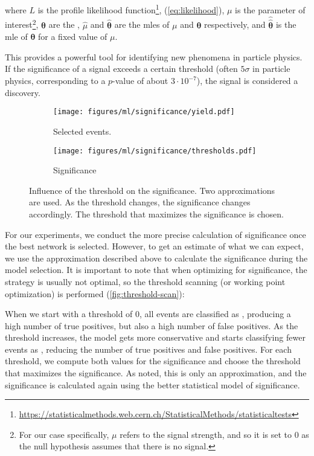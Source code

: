where $L$ is the profile likelihood
function\footnote{\url{https://statisticalmethods.web.cern.ch/StatisticalMethods/statisticaltests}},
(\autoref{eq:likelihood}), $\mu$ is the parameter of interest\footnote{For our case specifically, $\mu$ refers to the
    signal strength, and so it is set to $0$ as the null hypothesis assumes that there is no signal.}, $\bm{\theta}$ are
the , $\hat{\mu}$ and $\hat{\bm{\theta}}$ are the \glspl{mle} of $\mu$ and $\bm{\theta}$ respectively, and
$\hat{\hat{\bm{\theta}}}$ is the \gls{mle} of $\bm{\theta}$ for a fixed value of $\mu$.

This provides a powerful tool for identifying new phenomena in particle physics. If the significance of a signal exceeds
a certain threshold (often $5\sigma$ in particle physics, corresponding to a $p$-value of about $3\cdot10^{-7}$), the
signal is considered a discovery.

\begin{figure}[htb]
    \centering
    \begin{subfigure}[t]{0.47\textwidth}
        \texttt{[image: figures/ml/significance/yield.pdf]}
        \caption{Selected events.}
        \label{fig:signal-yield}
    \end{subfigure}
    \begin{subfigure}[t]{0.47\textwidth}
        \texttt{[image: figures/ml/significance/thresholds.pdf]}
        \caption{Significance}
        \label{fig:threshold-scan}
    \end{subfigure}
    \hfill
    \caption[Influence of the threshold on the significance]
    {Influence of the threshold on the significance. Two approximations are used. As the threshold changes, the
        significance changes accordingly. The threshold that maximizes the significance is chosen.}
    \label{fig:significance-optimization}
\end{figure}

For our experiments, we conduct the more precise calculation of significance once the best network is selected. However,
to get an estimate of what we can expect, we use the approximation described above to calculate the significance during
the model selection. It is important to note that when optimizing for significance, the \argmax strategy is usually not
optimal, so the threshold scanning (or working point optimization) is performed (\autoref{fig:threshold-scan}):


When we start with a threshold of 0, all events are classified as \tth, producing a high number of true
positives, but also a high number of false positives. As the threshold increases, the model gets more conservative and
starts classifying fewer events as \tth, reducing the number of true positives and false positives. For each threshold,
we compute both values for the significance and choose the threshold that maximizes the significance. As noted, this
is only an approximation, and the significance is calculated again using the better statistical model of significance.